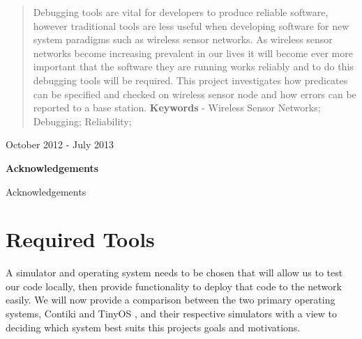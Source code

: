 \documentclass[a4paper,notitlepage]{article}
\makeatletter
\newcommand\ackname{Acknowledgements}
\newenvironment{acknowledgements}{%
      \titlepage
      \null\vfil
      \@beginparpenalty\@lowpenalty
      \begin{center}%
        \bfseries \ackname
        \@endparpenalty\@M
      \end{center}}%
     {\par\vfil\null\endtitlepage}
\newenvironment{acknowledgements}{%
      \if@twocolumn
        \section*{\abstractname}%
      \else
        \small
        \begin{center}%
          {\bfseries \ackname\vspace{-.5em}\vspace{\z@}}%
        \end{center}%
        \quotation
      \fi}
      {\if@twocolumn\else\endquotation\fi}
\makeatother
\begin{document}
\begin{titlepage}
\begin{center}
\begin{abstract}
Debugging tools are vital for developers to produce reliable software, however traditional tools are less useful when developing software for new system paradigms such as wireless sensor networks. As wireless sensor networks become increasing prevalent in our lives it will become ever more important that the software they are running works reliably and to do this debugging tools will be required. This project investigates how predicates can be specified and checked on wireless sensor node and how errors can be reported to a base station.
\newline
\newline
\noindent \textbf{Keywords} - Wireless Sensor Networks; Debugging; Reliability;
\end{abstract}

\vfill
\vfill
\vfill
\vfill

{\large October 2012 - July 2013}

\end{center}
\end{titlepage}

\pagestyle{empty}
\thispagestyle{empty}\clearpage

\newpage

\begin{acknowledgements}
Acknowledgements
\end{acknowledgements}
\newpage


\pagestyle{plain}
\setcounter{page}{1}

\tableofcontents
\clearpage




\clearpage



\clearpage

\section{Required Tools}

A simulator and operating system needs to be chosen that will allow us to test our code locally, then provide functionality to deploy that code to the network easily. We will now provide a comparison between the two primary operating systems, Contiki \cite{23839452} and TinyOS \cite{levis2003tossim}, and their respective simulators with a view to deciding which system best suits this projects goals and motivations.
\end{document}
